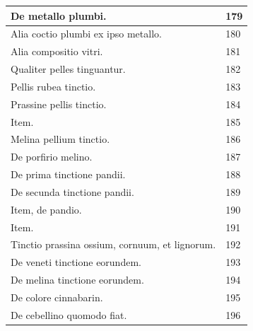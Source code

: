 \documentclass[a4paper, 11pt, oneside, polutonikogreek, italian]{article}
\begin{document}
\begin{center}
\begin{longtable}{|p{60mm}|l|}
         De metallo plumbi.                                                              & 179 \\ \hline
         Alia coctio plumbi ex ipso metallo.                                             & 180 \\ \hline
         Alia compositio vitri.                                                          & 181 \\ \hline
         Qualiter pelles tinguantur.                                                     & 182 \\ \hline
         Pellis rubea tinctio.                                                           & 183 \\ \hline
         Prassine pellis tinctio.                                                        & 184 \\ \hline
         Item.                                                                           & 185 \\ \hline
         Melina pellium tinctio.                                                         & 186 \\ \hline
         De porfirio melino.                                                             & 187 \\ \hline
         De prima tinctione pandii.                                                      & 188 \\ \hline
         De secunda tinctione pandii.                                                    & 189 \\ \hline
         Item, de pandio.                                                                & 190 \\ \hline
         Item.                                                                           & 191 \\ \hline
         Tinctio prassina ossium, cornuum, et lignorum.                                  & 192 \\ \hline
         De veneti tinctione eorundem.                                                   & 193 \\ \hline
         De melina tinctione eorundem.                                                   & 194 \\ \hline
         De colore cinnabarin.                                                           & 195 \\ \hline
         De cebellino quomodo fiat.                                                      & 196 \\ \hline

\end{longtable}
\end{center}
\end{document}
